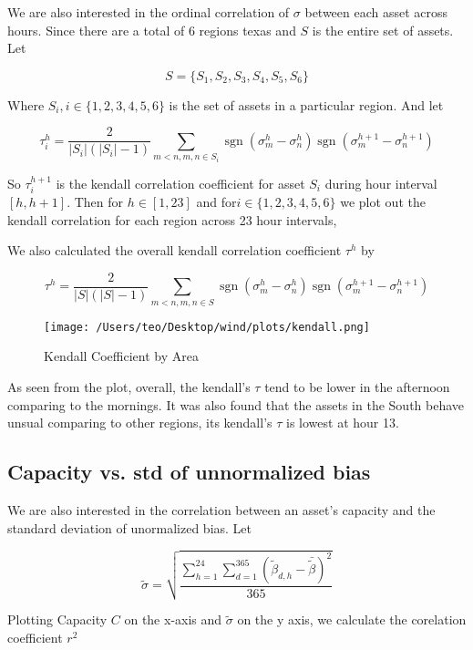 \documentclass[
]{article}
\begin{document}
We are also interested in the ordinal correlation of \(\sigma\) between
each asset across hours. Since there are a total of 6 regions texas and
\(S\) is the entire set of assets. Let

\[S = \{ S_1, S_2, S_3, S_4, S_5,S_6\}\]

Where \(S_i, i \in \{1,2,3,4,5,6\}\) is the set of assets in a
particular region. And let

\[\tau_i^{h}=\frac{2}{|S_i|(|S_i|-1)} \sum_{m<n, m,n \in S_i} \operatorname{sgn}\left(\sigma_{m}^{h}-\sigma_{n}^{h}\right) \operatorname{sgn}\left(\sigma_{m}^{h+1}-\sigma_{n}^{h+1}\right)\]

So \(\tau_i^{h+1}\) is the kendall correlation coefficient for asset
\(S_i\) during hour interval \([h,h+1]\). Then for \(h \in [1,23]\) and
for\(  i \in \{ 1,2,3,4,5,6\}\) we plot out the kendall correlation for
each region across 23 hour intervals,

We also calculated the overall kendall correlation coefficient
\(\tau^h\) by

\[\tau^{h}=\frac{2}{|S|(|S|-1)} \sum_{m<n, m,n \in S} \operatorname{sgn}\left(\sigma_{m}^{h}-\sigma_{n}^{h}\right) \operatorname{sgn}\left(\sigma_{m}^{h+1}-\sigma_{n}^{h+1}\right)\]

\begin{figure}
\centering
\texttt{[image: /Users/teo/Desktop/wind/plots/kendall.png]}
\caption{Kendall Coefficient by Area}
\end{figure}

As seen from the plot, overall, the kendall's \(\tau\) tend to be lower
in the afternoon comparing to the mornings. It was also found that the
assets in the South behave unsual comparing to other regions, its
kendall's \(\tau\) is lowest at hour 13.

\hypertarget{capacity-vs--std-of-unnormalized-bias}{%
\subsection{Capacity vs. std of unnormalized
bias}\label{capacity-vs--std-of-unnormalized-bias}}

We are also interested in the correlation between an asset's capacity
and the standard deviation of unormalized bias. Let

\[\tilde{\sigma}= \sqrt{\frac{\sum_{h = 1}^{24}\sum_{d = 1}^{365}\left(\tilde{\beta}_{d,h}-\bar{\tilde{\beta}}\right)^{2}}{365}}\]

Plotting Capacity \(C\) on the x-axis and \(\tilde{\sigma}\) on the y
axis, we calculate the corelation coefficient \(r^2\)
\end{document}
